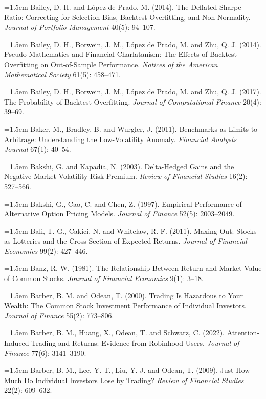 \hangindent=1.5em Bailey, D. H. and L\'opez de Prado, M. (2014). The Deflated Sharpe Ratio: Correcting for Selection Bias, Backtest Overfitting, and Non-Normality. \emph{Journal of Portfolio Management} 40(5): 94--107.

\hangindent=1.5em Bailey, D. H., Borwein, J. M., L\'opez de Prado, M. and Zhu, Q. J. (2014). Pseudo-Mathematics and Financial Charlatanism: The Effects of Backtest Overfitting on Out-of-Sample Performance. \emph{Notices of the American Mathematical Society} 61(5): 458--471.

\hangindent=1.5em Bailey, D. H., Borwein, J. M., L\'opez de Prado, M. and Zhu, Q. J. (2017). The Probability of Backtest Overfitting. \emph{Journal of Computational Finance} 20(4): 39--69.

\hangindent=1.5em Baker, M., Bradley, B. and Wurgler, J. (2011). Benchmarks as Limits to Arbitrage: Understanding the Low-Volatility Anomaly. \emph{Financial Analysts Journal} 67(1): 40--54.

\hangindent=1.5em Bakshi, G. and Kapadia, N. (2003). Delta-Hedged Gains and the Negative Market Volatility Risk Premium. \emph{Review of Financial Studies} 16(2): 527--566.

\hangindent=1.5em Bakshi, G., Cao, C. and Chen, Z. (1997). Empirical Performance of Alternative Option Pricing Models. \emph{Journal of Finance} 52(5): 2003--2049.

\hangindent=1.5em Bali, T. G., Cakici, N. and Whitelaw, R. F. (2011). Maxing Out: Stocks as Lotteries and the Cross-Section of Expected Returns. \emph{Journal of Financial Economics} 99(2): 427--446.

\hangindent=1.5em Banz, R. W. (1981). The Relationship Between Return and Market Value of Common Stocks. \emph{Journal of Financial Economics} 9(1): 3--18.

\hangindent=1.5em Barber, B. M. and Odean, T. (2000). Trading Is Hazardous to Your Wealth: The Common Stock Investment Performance of Individual Investors. \emph{Journal of Finance} 55(2): 773--806.

\hangindent=1.5em Barber, B. M., Huang, X., Odean, T. and Schwarz, C. (2022). Attention-Induced Trading and Returns: Evidence from Robinhood Users. \emph{Journal of Finance} 77(6): 3141--3190.

\hangindent=1.5em Barber, B. M., Lee, Y.-T., Liu, Y.-J. and Odean, T. (2009). Just How Much Do Individual Investors Lose by Trading? \emph{Review of Financial Studies} 22(2): 609--632.

